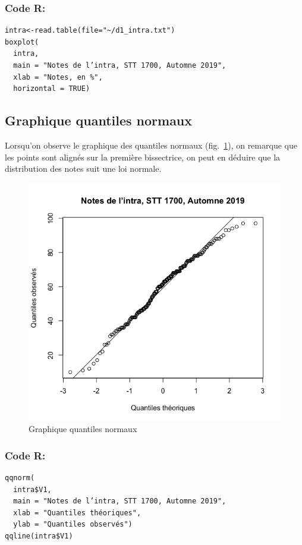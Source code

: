 \documentclass[10pt,twocolumn]{article}
\begin{document}
\subsubsection*{Code R:}
\begin{verbatim}
intra<-read.table(file="~/d1_intra.txt")
boxplot(
  intra,
  main = "Notes de l’intra, STT 1700, Automne 2019",
  xlab = "Notes, en %",
  horizontal = TRUE)
\end{verbatim}


\subsection{Graphique quantiles normaux}
Lorsqu’on observe le graphique des quantiles normaux (fig.~\ref{intraQqnorm}), on remarque que les points sont alignés sur la première bissectrice, on peut en déduire que la distribution des notes suit une loi normale.

\begin{figure}[htbp]
	\caption{Graphique quantiles normaux}
	\label{intraQqnorm}
	\centering
	\includegraphics[width=\linewidth]{d1_intraQqnorm}
\end{figure}

\subsubsection*{Code R:}
\begin{verbatim}
qqnorm(
  intra$V1,
  main = "Notes de l’intra, STT 1700, Automne 2019",
  xlab = "Quantiles théoriques",
  ylab = "Quantiles observés")
qqline(intra$V1)
\end{verbatim}
\end{document}
